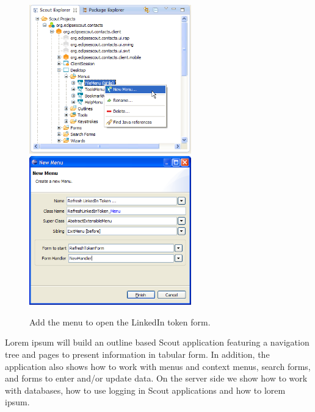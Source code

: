 \documentclass[a4paper,10pt,twoside]{book}
\begin{document}
\begin{figure}
\includegraphics[width=7cm]{new_menu_refreshtoken_contextmenu.png} \hspace{5mm}
\includegraphics[width=7cm]{new_menu_refreshtoken.png}
\caption{Add the menu to open the LinkedIn token form.}
\end{figure}

Lorem ipsum will build an outline based Scout application featuring a navigation tree and pages to present information in tabular form. 
In addition, the application also shows how to work with menus and context menus, search forms, and forms to enter and/or update data. 
On the server side we show how to work with databases, how to use logging in Scout applications and how to lorem ipsum. 
\end{document}
